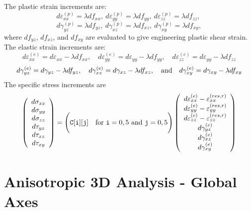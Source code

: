 \documentclass[11pt]{book}
\def\code#1{{\small\tt #1}}
\def\err#1{\varepsilon_{#1}^{(res,r)}}
\def\fvvec#1#2#3#4#5#6{\left(\begin{array}{ccc} #1 \\ #2 \\ #3 \\ #4 \\ #5 \\ #6 \end{array}\right)}
\def\g#1{\gamma_{#1}}
\def\s#1{\sigma_{#1}}
\def\t#1{\tau_{#1}}
\begin{document}
 The plastic strain increments are:
\begin{equation}
       d\varepsilon_{xx}^{(p)} = \lambda df_{xx}, \ 
       d\varepsilon_{yy}^{(p)} = \lambda df_{yy}, \ 
       d\varepsilon_{zz}^{(p)} = \lambda df_{zz}, \ 
\end{equation}
\begin{equation}
       d\gamma_{yz}^{(p)} =  \lambda df_{yz}, \ 
       d\gamma_{xz}^{(p)} =  \lambda df_{xz}, \ 
       d\gamma_{xy}^{(p)} =  \lambda df_{xy},
\end{equation}
where $df_{yz}$, $df_{xz}$, and $df_{xy}$ are evaluated to give engineering plastic shear strain. The elastic strain increments are:
\begin{equation}
       d\varepsilon_{xx}^{(e)} = d\varepsilon_{xx} -\lambda df_{xx}, \quad
       d\varepsilon_{yy}^{(e)} = d\varepsilon_{yy} -\lambda df_{yy}, \quad
       d\varepsilon_{zz}^{(e)} =  d\varepsilon_{yy} -\lambda df_{zz}
\end{equation}
\begin{equation}
       d\gamma_{yz}^{(e)} = d\gamma_{yz} -  \lambda df_{yz}, \quad 
       d\gamma_{xz}^{(e)} = d\gamma_{xz} -  \lambda df_{xz}, \quad  {\rm and} \quad
       d\gamma_{xy}^{(e)} = d\gamma_{xy} -  \lambda df_{xy}
\end{equation}
The specific stress increments are
\begin{equation}
      \fvvec{d\s{xx}}{d\s{yy}}{d\s{zz}}{d\t{yz}}{d\t{xz}}{d\t{xy}} = \Biggl(\code{C[i][j]} \quad {\rm for\ }\code{i}=0,5\ {\rm and\ }\code{j}=0,5\Biggr)
          \fvvec{d\varepsilon_{xx}^{(e)}  - \err{xx}}{d\varepsilon_{yy}^{(e)}  -\err{yy}}{d\varepsilon_{zz}^{(e)}  -\err{zz}}
                             {d\g{yz}^{(e)}}{d\g{xz}^{(e)}}{d\g{xy}^{(e)}}
 \end{equation}

\section{Anisotropic 3D Analysis - Global Axes}
\end{document}
